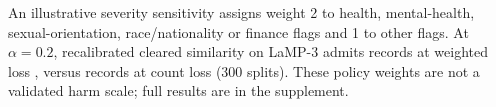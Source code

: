 An illustrative severity sensitivity assigns weight 2 to health, mental-health,
sexual-orientation, race/nationality or finance flags and 1 to other flags.
At $\alpha=0.2$, recalibrated cleared similarity on LaMP-3 admits
\threeWeightedSize{} records at weighted loss \threeWeightedLoss{}, versus
\threeCountSize{} records at count loss \threeCountLoss{} (300 splits).
These policy weights are not a validated harm scale; full results are in the supplement.
